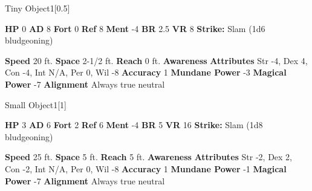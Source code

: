       
  \begin{monsubsection}{Tiny Object}{1}[0.5]
    \vspace{-1em}\vspace{-1em}
    \vspace{0em}

    
    

    \begin{spellcontent}
      \begin{spelltargetinginfo}
        \pari \textbf{HP} 0 \monsep
          \textbf{AD} 8 \monsep
          \textbf{Fort} 0 \monsep
          \textbf{Ref} 8 \monsep
          \textbf{Ment} -4
        \pari \textbf{BR} 2.5 \monsep
        \textbf{VR} 8
        \pari \textbf{Strike:}
            Slam  (1d6 bludgeoning)
      \end{spelltargetinginfo}
    \end{spellcontent}
    \begin{monsterfooter}
      \pari \textbf{Speed} 20 ft. \monsep
        \textbf{Space} 2-1/2 ft. \monsep
        \textbf{Reach} 0 ft.
      \pari \textbf{Awareness} 
      \pari \textbf{Attributes}
        Str -4, Dex 4,
        Con -4, Int N/A,
        Per 0, Wil -8
      \pari \textbf{Accuracy} 1 \monsep
        \textbf{Mundane Power} -3 \monsep
      \textbf{Magical Power} -7
      \pari \textbf{Alignment} Always true neutral
    \end{monsterfooter}
  \end{monsubsection}
  
  

  \begin{monsubsection}{Small Object}{1}[1]
    \vspace{-1em}\vspace{-1em}
    \vspace{0em}

    
    

    \begin{spellcontent}
      \begin{spelltargetinginfo}
        \pari \textbf{HP} 3 \monsep
          \textbf{AD} 6 \monsep
          \textbf{Fort} 2 \monsep
          \textbf{Ref} 6 \monsep
          \textbf{Ment} -4
        \pari \textbf{BR} 5 \monsep
        \textbf{VR} 16
        \pari \textbf{Strike:}
            Slam  (1d8 bludgeoning)
      \end{spelltargetinginfo}
    \end{spellcontent}
    \begin{monsterfooter}
      \pari \textbf{Speed} 25 ft. \monsep
        \textbf{Space} 5 ft. \monsep
        \textbf{Reach} 5 ft.
      \pari \textbf{Awareness} 
      \pari \textbf{Attributes}
        Str -2, Dex 2,
        Con -2, Int N/A,
        Per 0, Wil -8
      \pari \textbf{Accuracy} 1 \monsep
        \textbf{Mundane Power} -1 \monsep
      \textbf{Magical Power} -7
      \pari \textbf{Alignment} Always true neutral
    \end{monsterfooter}
  \end{monsubsection}
  
